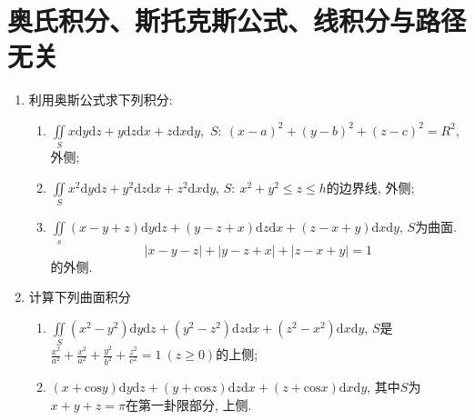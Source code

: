 \section{奥氏积分、斯托克斯公式、线积分与路径无关}
\begin{enumerate}
	\item 利用奥斯公式求下列积分:
	\begin{enumerate}
		\item $\displaystyle{\iint\limits_{S}x\mathrm{d}y\mathrm{d}z}+y\mathrm{d}z\mathrm{d}x+z\mathrm{d}x\mathrm{d}y$,~$S:~(x-a)^2+(y-b)^2+(z-c)^2=R^2$, 外侧;
		\item $\displaystyle{\iint\limits_{S}x^2\mathrm{d}y\mathrm{d}z+y^2\mathrm{d}z\mathrm{d}x+z^2\mathrm{d}x\mathrm{d}y}$, $S:~x^2+y^2\le z\le h$的边界线, 外侧;
		\item $\displaystyle{\iint\limits_{s}(x-y+z)\mathrm{d}y\mathrm{d}z+(y-z+x)\mathrm{d}z\mathrm{d}x+(z-x+y)\mathrm{d}x\mathrm{d}y}$, $S$为曲面.
	$$ |x-y-z|+|y-z+x|+|z-x+y|=1$$
	的外侧.
	\end{enumerate}
\item 计算下列曲面积分 
\begin{enumerate}
\item $\displaystyle{\iint\limits_{S}(x^2-y^2)\mathrm{d}y\mathrm{d}z+(y^2-z^2)\mathrm{d}z\mathrm{d}x+(z^2-x^2)\mathrm{d}x\mathrm{d}y}$, $S$是$\frac{x^2}{a^2}+\frac{x^2}{a^2}+\frac{y^2}{b^2}+\frac{z^2}{c^2}=1\ (z\ge 0)$的上侧;
\item $\displaystyle{(x+\mathrm{cos}y)\mathrm{d}y\mathrm{d}z+(y+\mathrm{cos}z)\mathrm{d}z\mathrm{d}x+(z+\mathrm{cos}x)\mathrm{d}x\mathrm{d}y}$, 其中$S$为$x+y+z=\pi$在第一卦限部分, 上侧.	
\end{enumerate}


\end{enumerate}
